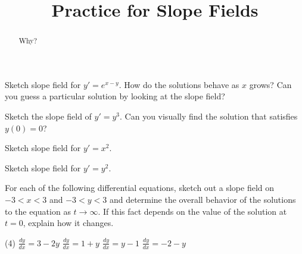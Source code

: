 \documentclass{ximera}
\title{Practice for Slope Fields}
\begin{document}
\begin{abstract}
    Why?
\end{abstract}
\maketitle

\begin{exercise}
    Sketch slope field for $y'=e^{x-y}$.  How do the solutions behave as $x$ grows?  Can you guess a particular solution by looking at the slope field?
\end{exercise}
%

\begin{exercise}%
    Sketch the slope field of $y'=y^3$.  Can you visually find the solution that satisfies $y(0)=0$?
\end{exercise}


\begin{exercise}
    Sketch slope field for $y'=x^2$.
\end{exercise}

\begin{exercise}
    Sketch slope field for $y'=y^2$.
\end{exercise}

\begin{exercise}
    For each of the following differential equations, sketch out a slope field on $-3 < x < 3$ and $-3 < y < 3$ and determine the overall behavior of the solutions to the equation as $t \rightarrow \infty$. If this fact depends on the value of the solution at $t=0$, explain how it changes.
    \begin{tasks}(4)
        \task $\displaystyle \frac{dy}{dx} = 3 - 2y$
        \task $\displaystyle \frac{dy}{dx} = 1 + y$
        \task $\displaystyle \frac{dy}{dx} = y - 1$
        \task $\displaystyle \frac{dy}{dx} = -2 - y$
    \end{tasks}
\end{exercise}
%
\end{document}
